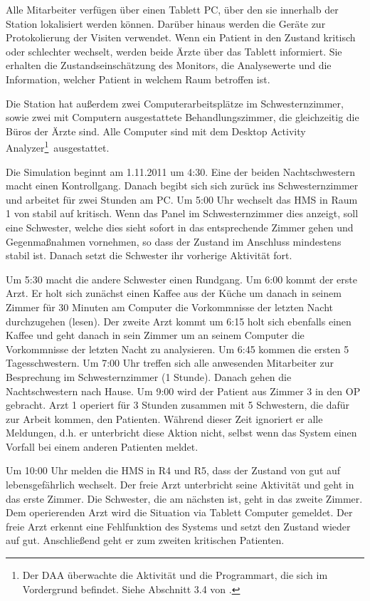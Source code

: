Alle Mitarbeiter verfügen über einen Tablett PC, über den sie innerhalb der Station lokalisiert werden können. Darüber hinaus werden die Geräte zur Protokolierung der Visiten verwendet. Wenn ein Patient in den Zustand kritisch oder schlechter wechselt, werden beide Ärzte über das Tablett informiert. Sie erhalten die Zustandseinschätzung des Monitors, die Analysewerte und die Information, welcher Patient in welchem Raum betroffen ist.

Die Station hat außerdem zwei Computerarbeitsplätze im Schwesternzimmer, sowie zwei mit Computern ausgestattete Behandlungszimmer, die gleichzeitig die Büros der Ärzte sind. Alle Computer sind mit dem \glqq Desktop Activity Analyzer\footnote{Der DAA überwachte die Aktivität und die Programmart, die sich im Vordergrund befindet. Siehe Abschnitt 3.4 von \cite{doku-sensor-aktuator}.}\grqq\ ausgestattet.

Die Simulation beginnt am 1.11.2011 um 4:30. Eine der beiden Nachtschwestern macht einen Kontrollgang. Danach begibt sich sich zurück ins Schwesternzimmer und arbeitet für zwei Stunden am PC. Um 5:00 Uhr wechselt das HMS in Raum 1 von stabil auf kritisch. Wenn das Panel im Schwesternzimmer dies anzeigt, soll eine Schwester, welche dies sieht sofort in das entsprechende Zimmer gehen und Gegenmaßnahmen vornehmen, so dass der Zustand im Anschluss mindestens stabil ist. Danach setzt die Schwester ihr vorherige Aktivität fort. 

Um 5:30 macht die andere Schwester einen Rundgang. Um 6:00 kommt der erste Arzt. Er holt sich zunächst einen Kaffee aus der Küche um danach in seinem Zimmer für 30 Minuten am Computer die Vorkommnisse der letzten Nacht durchzugehen (lesen). Der zweite Arzt kommt um 6:15 holt sich ebenfalls einen Kaffee und geht danach in sein Zimmer um an seinem Computer die Vorkommnisse der letzten Nacht zu analysieren. Um 6:45 kommen die ersten 5 Tagesschwestern. Um 7:00 Uhr treffen sich alle anwesenden Mitarbeiter zur Besprechung im Schwesternzimmer (1 Stunde). Danach gehen die Nachtschwestern nach Hause. Um 9:00 wird der Patient aus Zimmer 3 in den OP gebracht. Arzt 1 operiert für 3 Stunden zusammen mit 5 Schwestern, die dafür zur Arbeit kommen, den Patienten. Während dieser Zeit ignoriert er alle Meldungen, d.h. er unterbricht diese Aktion nicht, selbst wenn das System einen Vorfall bei einem anderen Patienten meldet.

Um 10:00 Uhr melden die HMS in R4 und R5, dass der Zustand von gut auf lebensgefährlich wechselt. Der freie Arzt unterbricht seine Aktivität und geht in das erste Zimmer. Die Schwester, die am nächsten ist, geht in das zweite Zimmer. Dem operierenden Arzt wird die Situation via Tablett Computer gemeldet. Der freie Arzt erkennt eine Fehlfunktion des Systems und setzt den Zustand wieder auf gut. Anschließend geht er zum zweiten kritischen Patienten. 

